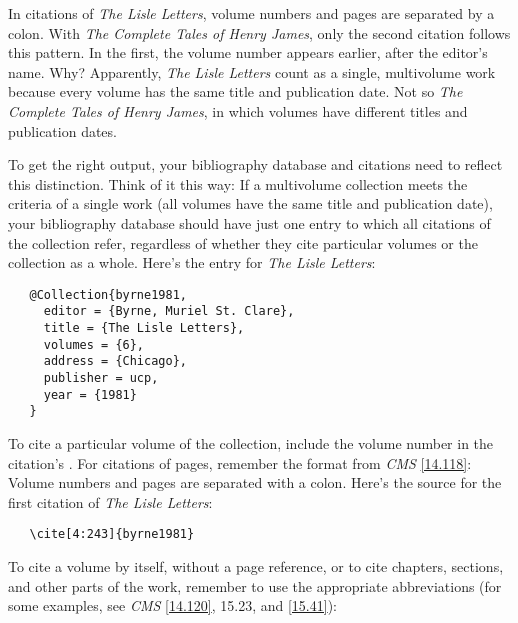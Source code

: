 \documentclass[11pt,letterpaper,oneside]{article}
\begin{document}
\begin{citeonly}
\item \cite[4:243]{byrne1981}
\item \cite*[32--33]{james1963.5}
\item \cite[4:245]{byrne1981}
\item \cite*[34]{james1963.5}
\end{citeonly}

In citations of \textit{The Lisle Letters}, volume numbers and pages
are separated by a colon. With \textit{The Complete Tales of Henry
James}, only the second citation follows this pattern. In the first,
the volume number appears earlier, after the editor's name. Why?
Apparently, \textit{The Lisle Letters} count as a single, multivolume
work because every volume has the same title and publication date. Not
so \textit{The Complete Tales of Henry James}, in which volumes have
different titles and publication dates.

To get the right output, your bibliography database and citations need
to reflect this distinction. Think of it this way: If a multivolume
collection meets the criteria of a single work (all volumes have the
same title and publication date), your bibliography database should
have just one entry to which all citations of the collection refer,
regardless of whether they cite particular volumes or the collection
as a whole. Here's the entry for \textit{The Lisle Letters}:

\begin{verbatim}
   @Collection{byrne1981,
     editor = {Byrne, Muriel St. Clare},
     title = {The Lisle Letters},
     volumes = {6},
     address = {Chicago},
     publisher = ucp,
     year = {1981}
   }
\end{verbatim}

To cite a particular volume of the collection, include the volume
number in the citation's . For citations of pages,
remember the format from \textit{CMS} \ref{14.118}: Volume numbers and
pages are separated with a colon. Here's the source for the first
citation of \textit{The Lisle Letters}:

\begin{verbatim}
   \cite[4:243]{byrne1981}
\end{verbatim}

\noindent To cite a volume by itself, without a page reference, or to
cite chapters, sections, and other parts of the work, remember to use
the appropriate abbreviations (for some examples, see \textit{CMS}
\ref{14.120}, 15.23, and \ref{15.41}):
\end{document}
